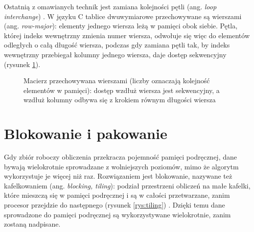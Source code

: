 \documentclass[a4paper,12pt]{book} %
\begin{document}
Ostatnią z omawianych technik jest zamiana kolejności pętli (ang. \emph{loop interchange}) \cite{hennessy2017architecture}. W języku C tablice dwuwymiarowe przechowywane są wierszami (ang. \emph{row-major}): elementy jednego wiersza leżą w pamięci obok siebie. Pętla, której indeks wewnętrzny zmienia numer wiersza, odwołuje się więc do elementów odległych o całą długość wiersza, podczas gdy zamiana pętli tak, by indeks wewnętrzny przebiegał kolumny jednego wiersza, daje dostęp sekwencyjny (rysunek \ref{rys:interchange}).

\begin{figure}[t!]
\centering
{}
\caption{Macierz przechowywana wierszami (liczby oznaczają kolejność elementów w pamięci): dostęp wzdłuż wiersza jest sekwencyjny, a wzdłuż kolumny odbywa się z krokiem równym długości wiersza}
\label{rys:interchange}
\end{figure}

\section{Blokowanie i pakowanie}
\label{sec:blokowanie}

Gdy zbiór roboczy obliczenia przekracza pojemność pamięci podręcznej, dane bywają wielokrotnie sprowadzane z wolniejszych poziomów, mimo że algorytm wykorzystuje je więcej niż raz. Rozwiązaniem jest blokowanie, nazywane też kafelkowaniem (ang. \emph{blocking, tiling}): podział przestrzeni obliczeń na małe kafelki, które mieszczą się w pamięci podręcznej i są w całości przetwarzane, zanim procesor przejdzie do następnego (rysunek \ref{rys:tiling}) \cite{drepper2007memory}. Dzięki temu dane sprowadzone do pamięci podręcznej są wykorzystywane wielokrotnie, zanim zostaną nadpisane.
\end{document}
